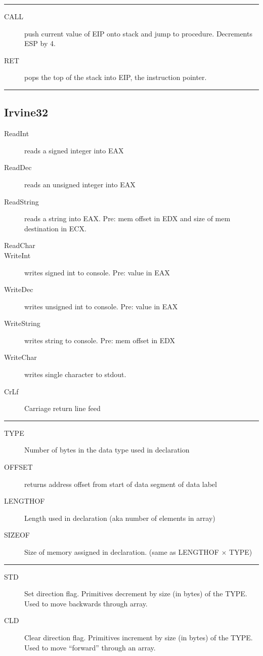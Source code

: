 \documentclass[10pt,landscape]{article}
\newcommand{\mysep}{\vspace{0.1cm}\hrule\vspace{0.1cm}}
\begin{document}
\begin{multicols*}{3}
\mysep

\begin{description}
  \item[CALL] push current value of EIP onto stack and jump to procedure.
    Decrements ESP by 4.
  \item[RET] pops the top of the stack into EIP, the instruction pointer.
\end{description}

\mysep

\subsection{Irvine32}

\begin{description}
  \item[ReadInt] reads a signed integer into EAX 
  \item[ReadDec] reads an unsigned integer into EAX
  \item[ReadString] reads a string into EAX. Pre: mem offset in EDX and size of
    mem destination in ECX.
  \item[ReadChar] 
  \item[WriteInt] writes signed int to console. Pre: value in EAX
  \item[WriteDec] writes unsigned int to console. Pre: value in EAX
  \item[WriteString] writes string to console. Pre: mem offset in EDX
  \item[WriteChar] writes single character to stdout.
  \item[CrLf] Carriage return line feed
\end{description}

\mysep

\begin{description}
	\item[TYPE] Number of bytes in the data type used in declaration
	\item[OFFSET] returns address offset from start of data segment of data label
	\item[LENGTHOF] Length used in declaration (aka number of elements in array)
  \item[SIZEOF] Size of memory assigned in declaration. (same as LENGTHOF
    $\times$ TYPE)
\end{description}

\mysep

\begin{description}
	\item[STD] Set direction flag. Primitives decrement by size (in bytes) of the 
		TYPE. Used to move backwards through array.
  \item[CLD] Clear direction flag. Primitives increment by size (in bytes) of
    the TYPE. Used to move ``forward'' through an array.
\end{description}


\end{multicols*}
\end{document}
